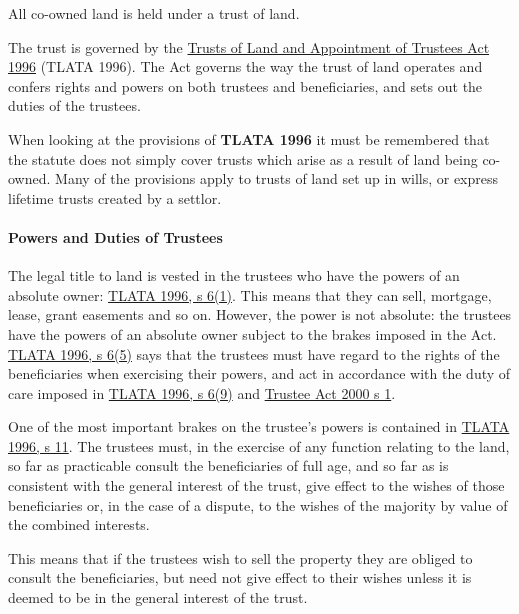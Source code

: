\documentclass[
]{article}
\begin{document}
All co-owned land is held under a trust of land.

The trust is governed by the
\href{https://www.legislation.gov.uk/ukpga/1996/47/contents}{Trusts of
Land and Appointment of Trustees Act 1996} (TLATA 1996). The Act governs
the way the trust of land operates and confers rights and powers on both
trustees and beneficiaries, and sets out the duties of the trustees.

When looking at the provisions of \textbf{TLATA 1996} it must be
remembered that the statute does not simply cover trusts which arise as
a result of land being co-owned. Many of the provisions apply to trusts
of land set up in wills, or express lifetime trusts created by a
settlor.

\hypertarget{powers-and-duties-of-trustees}{%
\paragraph{Powers and Duties of
Trustees}\label{powers-and-duties-of-trustees}}

The legal title to land is vested in the trustees who have the powers of
an absolute owner:
\href{https://www.legislation.gov.uk/ukpga/1996/47/section/6}{TLATA
1996, s 6(1)}. This means that they can sell, mortgage, lease, grant
easements and so on. However, the power is not absolute: the trustees
have the powers of an absolute owner subject to the brakes imposed in
the Act.
\href{https://www.legislation.gov.uk/ukpga/1996/47/section/6}{TLATA
1996, s 6(5)} says that the trustees must have regard to the rights of
the beneficiaries when exercising their powers, and act in accordance
with the duty of care imposed in
\href{https://www.legislation.gov.uk/ukpga/1996/47/section/6}{TLATA
1996, s 6(9)} and
\href{https://www.legislation.gov.uk/ukpga/2000/29/section/1}{Trustee
Act 2000 s 1}.

One of the most important brakes on the trustee's powers is contained in
\href{https://www.legislation.gov.uk/ukpga/1996/47/section/11}{TLATA
1996, s 11}. The trustees must, in the exercise of any function relating
to the land, so far as practicable consult the beneficiaries of full
age, and so far as is consistent with the general interest of the trust,
give effect to the wishes of those beneficiaries or, in the case of a
dispute, to the wishes of the majority by value of the combined
interests.

This means that if the trustees wish to sell the property they are
obliged to consult the beneficiaries, but need not give effect to their
wishes unless it is deemed to be in the general interest of the trust.
\end{document}

